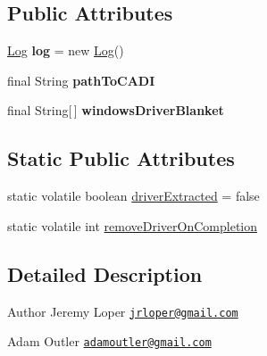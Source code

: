\subsection*{Public Attributes}
\begin{DoxyCompactItemize}
\item 
\hypertarget{classCASUAL_1_1WindowsDrivers_a89fa44b9e144ad395ac16ba1702cf7cf}{\hyperlink{classCASUAL_1_1Log}{Log} {\bfseries log} = new \hyperlink{classCASUAL_1_1Log}{Log}()}\label{classCASUAL_1_1WindowsDrivers_a89fa44b9e144ad395ac16ba1702cf7cf}

\item 
\hypertarget{classCASUAL_1_1WindowsDrivers_a359ca3d9318915e19dbf6551c1bb3459}{final String {\bfseries path\-To\-C\-A\-D\-I}}\label{classCASUAL_1_1WindowsDrivers_a359ca3d9318915e19dbf6551c1bb3459}

\item 
\hypertarget{classCASUAL_1_1WindowsDrivers_a42c7c1e515d46591edacc8bb8bc259d6}{final String\mbox{[}$\,$\mbox{]} {\bfseries windows\-Driver\-Blanket}}\label{classCASUAL_1_1WindowsDrivers_a42c7c1e515d46591edacc8bb8bc259d6}

\end{DoxyCompactItemize}
\subsection*{Static Public Attributes}
\begin{DoxyCompactItemize}
\item 
static volatile boolean \hyperlink{classCASUAL_1_1WindowsDrivers_aeffffe5b6287581f84fab6058eb72bfc}{driver\-Extracted} = false
\item 
static volatile int \hyperlink{classCASUAL_1_1WindowsDrivers_a59919a5f38e8d9ff9eda58fb443e039e}{remove\-Driver\-On\-Completion}
\end{DoxyCompactItemize}


\subsection{Detailed Description}


 \begin{DoxyAuthor}{Author}
Jeremy Loper \href{mailto:jrloper@gmail.com}{\tt jrloper@gmail.\-com} 

Adam Outler \href{mailto:adamoutler@gmail.com}{\tt adamoutler@gmail.\-com} 

 
\end{DoxyAuthor}


